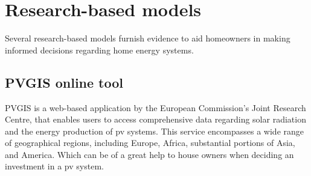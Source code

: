 \section{Research-based models}

Several research-based models furnish evidence to aid homeowners in making informed decisions regarding home energy systems.


\subsection{PVGIS online tool}
PVGIS \cite{pvgis} is a web-based application by the European Commission's Joint Research Centre, 
that enables users to access comprehensive data regarding solar radiation and the energy production of \gls{pv} systems. 
This service encompasses a wide range of geographical regions, including Europe, Africa, substantial portions of Asia, and America.
Which can be of a great help to house owners when deciding an investment in a \gls{pv} system. 

